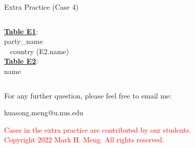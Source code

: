 \begin{frame}[fragile]{Extra Practice (Case 4)}
\begin{columns}
	
		\underline{\textbf{Table E1}}: \\ party\_name\\ ~ country (E2.name) \\\vspace{5pt}
		\underline{\textbf{Table E2}}: \\ name
	\end{columns}
\end{frame}
	
\begin{frame}{}
	\centering  
	For any further question, please feel free to email me:\vspace{10pt}
	
	huasong.meng@u.nus.edu \vspace{20pt}
	
	\begin{tcolorbox}
		\begin{center}
			\textcolor{red}{Cases in the extra practice are contributed by our students.\\\vspace{5pt}Copyright 2022 Mark H. Meng. All rights reserved.}
		\end{center}
	\end{tcolorbox}
\end{frame}